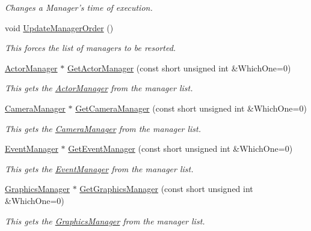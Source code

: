 \begin{DoxyCompactItemize}
\begin{DoxyCompactList}\small\item\em Changes a Manager's time of execution. \item\end{DoxyCompactList}\item 
void \hyperlink{classphys_1_1World_ae807112b9494a94a6ff0d60df0a4d424}{UpdateManagerOrder} ()
\begin{DoxyCompactList}\small\item\em This forces the list of managers to be resorted. \item\end{DoxyCompactList}\item 
\hyperlink{classphys_1_1ActorManager}{ActorManager} $\ast$ \hyperlink{classphys_1_1World_abe5e7e90d42ed64aeddb339af40dd857}{GetActorManager} (const short unsigned int \&WhichOne=0)
\begin{DoxyCompactList}\small\item\em This gets the \hyperlink{classphys_1_1ActorManager}{ActorManager} from the manager list. \item\end{DoxyCompactList}\item 
\hyperlink{classphys_1_1CameraManager}{CameraManager} $\ast$ \hyperlink{classphys_1_1World_a33ab68866da54b7f8f766d5d29171fb7}{GetCameraManager} (const short unsigned int \&WhichOne=0)
\begin{DoxyCompactList}\small\item\em This gets the \hyperlink{classphys_1_1CameraManager}{CameraManager} from the manager list. \item\end{DoxyCompactList}\item 
\hyperlink{classphys_1_1EventManager}{EventManager} $\ast$ \hyperlink{classphys_1_1World_ac20a304413b4d47f9ae657983e903a67}{GetEventManager} (const short unsigned int \&WhichOne=0)
\begin{DoxyCompactList}\small\item\em This gets the \hyperlink{classphys_1_1EventManager}{EventManager} from the manager list. \item\end{DoxyCompactList}\item 
\hyperlink{classphys_1_1GraphicsManager}{GraphicsManager} $\ast$ \hyperlink{classphys_1_1World_a15f968adb5d841da6c5eb51607a8f525}{GetGraphicsManager} (const short unsigned int \&WhichOne=0)
\begin{DoxyCompactList}\small\item\em This gets the \hyperlink{classphys_1_1GraphicsManager}{GraphicsManager} from the manager list. \item\end{DoxyCompactList}\item 

\end{DoxyCompactItemize}
